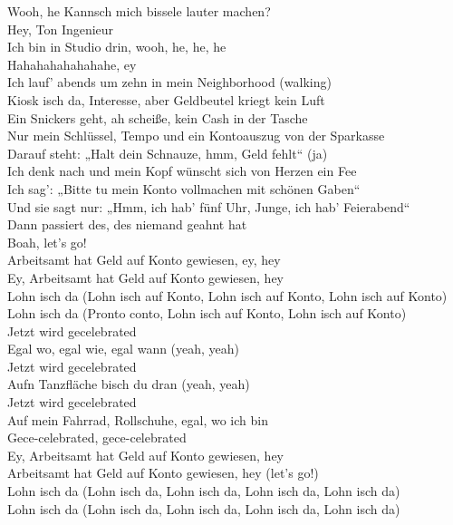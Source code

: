 \centering
Wooh, he
Kannsch mich bissele lauter machen? \\
Hey, Ton Ingenieur\\
Ich bin in Studio drin, wooh, he, he, he\\
Hahahahahahahahe, ey\\
Ich lauf' abends um zehn in mein Neighborhood (walking)\\
Kiosk isch da, Interesse, aber Geldbeutel kriegt kein Luft\\
Ein Snickers geht, ah scheiße, kein Cash in der Tasche\\
Nur mein Schlüssel, Tempo und ein Kontoauszug von der Sparkasse\\
Darauf steht: „Halt dein Schnauze, hmm, Geld fehlt“ (ja)\\
Ich denk nach und mein Kopf wünscht sich von Herzen ein Fee\\
Ich sag': „Bitte tu mein Konto vollmachen mit schönen Gaben“\\
Und sie sagt nur: „Hmm, ich hab' fünf Uhr, Junge, ich hab' Feierabend“\\
Dann passiert des, des niemand geahnt hat\\
Boah, let's go!\\
Arbeitsamt hat Geld auf Konto gewiesen, ey, hey\\
Ey, Arbeitsamt hat Geld auf Konto gewiesen, hey\\
Lohn isch da (Lohn isch auf Konto, Lohn isch auf Konto, Lohn isch auf Konto)\\
Lohn isch da (Pronto conto, Lohn isch auf Konto, Lohn isch auf Konto)\\
Jetzt wird gecelebrated\\
Egal wo, egal wie, egal wann (yeah, yeah)\\
Jetzt wird gecelebrated\\
Aufn Tanzfläche bisch du dran (yeah, yeah)\\
Jetzt wird gecelebrated\\
Auf mein Fahrrad, Rollschuhe, egal, wo ich bin\\
Gece-celebrated, gece-celebrated\\
Ey, Arbeitsamt hat Geld auf Konto gewiesen, hey\\
Arbeitsamt hat Geld auf Konto gewiesen, hey (let's go!)\\
Lohn isch da (Lohn isch da, Lohn isch da, Lohn isch da, Lohn isch da)\\
Lohn isch da (Lohn isch da, Lohn isch da, Lohn isch da, Lohn isch da)\\
